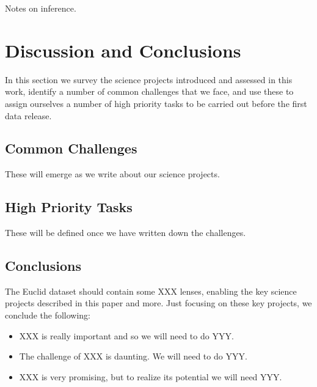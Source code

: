 \documentclass[twocolumn]{svjour3}
\begin{document}
Notes on inference.\\





\vspace{30pt}



\section{Discussion and Conclusions}
\label{sec:conclusions}

In this section we survey the science projects introduced and assessed
in this  work, identify a number of common challenges that we face, and
use these to  assign ourselves a number of high priority tasks to be
carried out before the first data release.

\subsection{Common Challenges}

These will emerge as we write about our science projects.


\subsection{High Priority Tasks}

These will be defined once we have written down the challenges.


\subsection{Conclusions}

The Euclid dataset should contain some XXX lenses, enabling the key
science projects described in this paper and more. Just focusing on
these key projects, we conclude the following:

\begin{itemize}

\item XXX is really important and so we will need to do YYY.

\item The challenge of XXX is daunting. We will need to do YYY.

\item XXX is very promising, but to realize its potential we will need
YYY.

\end{itemize}
\end{document}
